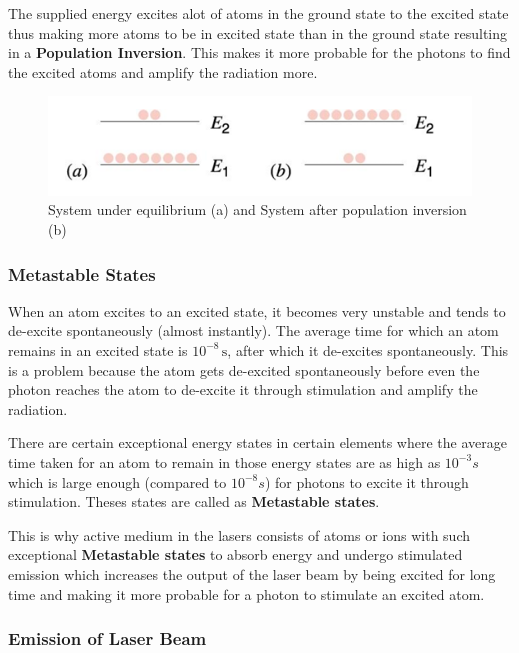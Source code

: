 \documentclass[12pt]{article}
\begin{document}
The supplied energy excites alot of atoms in the ground state to the excited state thus making more atoms to be in excited state than in the ground state resulting in a \textbf{Population Inversion}. This makes it more probable for the photons to find the excited atoms and amplify the radiation more. \vspace{.2cm}

\begin{figure}[H]
    \centering
    \includegraphics[scale=.8]{./img/10_population_inversion.png}
    \caption{System under equilibrium (a) and System after population inversion (b)}
\end{figure}

\subsubsection{Metastable States}

When an atom excites to an excited state, it becomes very unstable and tends to de-excite spontaneously (almost instantly). The average time for which an atom remains in an excited state is $10^{-8}\,\text{s}$, after which it de-excites spontaneously. This is a problem because the atom gets de-excited spontaneously before even the photon reaches the atom to de-excite it through stimulation and amplify the radiation.
\vspace{.2cm}

There are certain exceptional energy states in certain elements where the average time taken for an atom to remain in those energy states are as high as $10^{-3}s$ which is large enough (compared to $10^{-8}s$) for photons to excite it through stimulation. Theses states are called as \textbf{Metastable states}. \vspace{.2cm} 

This is why active medium in the lasers consists of atoms or ions with such exceptional \textbf{Metastable states} to absorb energy and undergo stimulated emission which increases the output of the laser beam by being excited for long time and making it more probable for a photon to stimulate an excited atom.

\subsubsection{Emission of Laser Beam}
\end{document}
